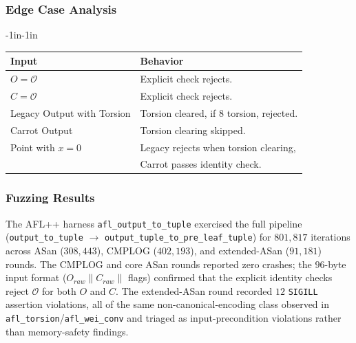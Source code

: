 \documentclass[12pt,titlepage,table]{article}
\begin{document}
\subsubsection{Edge Case Analysis}
\begin{table}[htbp]
\begin{adjustwidth}{-1in}{-1in}
\centering
{
\begin{tabular}{| p{1.8in} | p{4.3in} |}
\hline
\textbf{Input} & \textbf{Behavior} \\
\hline
\hline
$O = \mathcal{O}$ & Explicit check rejects. \\
$C = \mathcal{O}$ & Explicit check rejects.\\
Legacy Output with Torsion & Torsion cleared, if 8 torsion, rejected. \\
Carrot Output & Torsion clearing skipped. \\
Point with $x = 0$ & Legacy rejects when torsion clearing, \\
& Carrot passes identity check. \\
\hline
\end{tabular}}
\end{adjustwidth}
\end{table}


\subsubsection{Fuzzing Results}
The AFL++ harness \verb+afl_output_to_tuple+ exercised the full pipeline (\verb+output_to_tuple+ $\to$ \verb+output_tuple_to_pre_leaf_tuple+) for $801{,}817$ iterations across ASan ($308{,}443$), CMPLOG ($402{,}193$), and extended-ASan ($91{,}181$) rounds.  The CMPLOG and core ASan rounds reported zero crashes; the $96$-byte input format ($O_{raw} \| C_{raw} \|$ flags) confirmed that the explicit identity checks reject $\mathcal{O}$ for both $O$ and $C$.  The extended-ASan round recorded $12$ \verb+SIGILL+ assertion violations, all of the same non-canonical-encoding class observed in \verb+afl_torsion+/\verb+afl_wei_conv+ and triaged as input-precondition violations rather than memory-safety findings.

\end{document}
